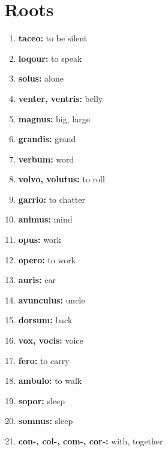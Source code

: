 \documentclass{article}
\begin{document}
\section{Roots}
\begin{enumerate}
    \item \textbf{taceo: }{to be silent}
    \item \textbf{loqour: }{to speak}
    \item \textbf{solus: }{alone}
    \item \textbf{venter, ventris: }{belly}
    \item \textbf{magnus: }{big, large}
    \item \textbf{grandis: }{grand}
    \item \textbf{verbum: }{word}
    \item \textbf{volvo, volutus: }{to roll}
    \item \textbf{garrio: }{to chatter}
    \item \textbf{animus: }{mind}
    \item \textbf{opus: }{work}
    \item \textbf{opero: }{to work}
    \item \textbf{auris: }{ear}
    \item \textbf{avunculus: }{uncle}
    \item \textbf{dorsum: }{back}
    \item \textbf{vox, vocis: }{voice}
    \item \textbf{fero: }{to carry}
    \item \textbf{ambulo: }{to walk}
    \item \textbf{sopor: }{sleep}
    \item \textbf{somnus: }{sleep}
    \item \textbf{con-, col-, com-, cor-: }{with, together}
    
\end{enumerate}
\end{document}
